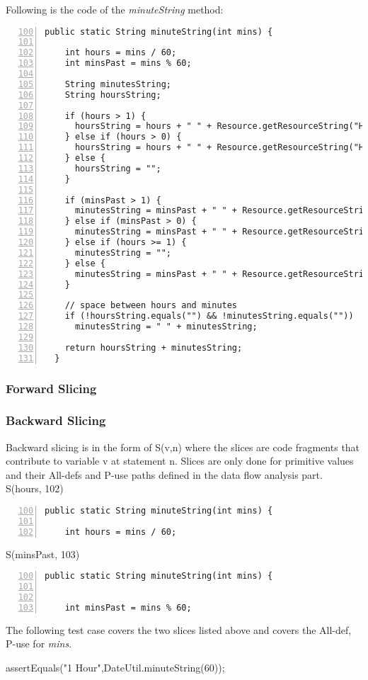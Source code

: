 \documentclass[fontsize=12pt,paper=letter,twoside]{scrartcl}
\begin{document}
\noindent Following is the code of the \emph{minuteString} method:
\begin{lstlisting}[numbers=left,firstnumber=100]
  public static String minuteString(int mins) {
    
    int hours = mins / 60;
    int minsPast = mins % 60;
    
    String minutesString;
    String hoursString;
    
    if (hours > 1) {
      hoursString = hours + " " + Resource.getResourceString("Hours");
    } else if (hours > 0) {
      hoursString = hours + " " + Resource.getResourceString("Hour");
    } else {
      hoursString = "";
    }

    if (minsPast > 1) {
      minutesString = minsPast + " " + Resource.getResourceString("Minutes");
    } else if (minsPast > 0) {
      minutesString = minsPast + " " + Resource.getResourceString("Minute");
    } else if (hours >= 1) {
      minutesString = "";
    } else {
      minutesString = minsPast + " " + Resource.getResourceString("Minutes");
    }

    // space between hours and minutes
    if (!hoursString.equals("") && !minutesString.equals(""))
      minutesString = " " + minutesString;

    return hoursString + minutesString;
  }
\end{lstlisting}

\subsubsection{Forward Slicing}


\subsubsection{Backward Slicing}
Backward slicing is in the form of S(v,n) where the slices are code fragments that contribute to variable v at statement n. Slices are only done for primitive values and their All-defs and P-use paths defined in the data flow analysis part.\\

S(hours, 102)
\begin{lstlisting}[numbers=left,firstnumber=100]
  public static String minuteString(int mins) {
    
    int hours = mins / 60;
\end{lstlisting}  


S(minsPast, 103)
\begin{lstlisting}[numbers=left,firstnumber=100]
  public static String minuteString(int mins) {
    
    
    int minsPast = mins % 60;
\end{lstlisting} 
The following test case covers the two slices listed above and covers the All-def, P-use for \emph{mins}.
\begin{code}
  assertEquals("1 Hour",DateUtil.minuteString(60));
\end{code}
\end{document}

